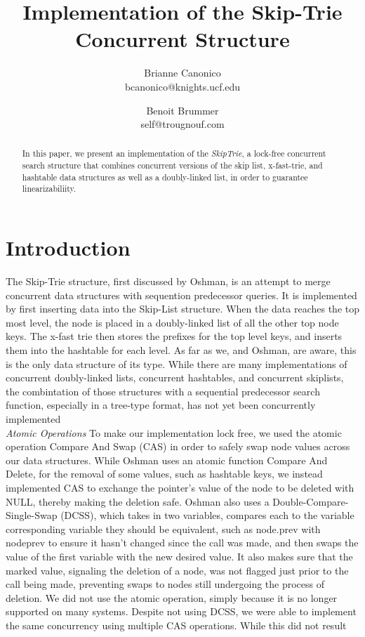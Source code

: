 \documentclass[10pt,twocolumn]{article}
\begin{document}
\title{Implementation of the Skip-Trie Concurrent Structure}
\author{Brianne Canonico\\bcanonico@knights.ucf.edu
\and Benoit Brummer\\self@trougnouf.com}
\date{}
\maketitle

\begin{abstract}
In this paper, we present an implementation of the \emph{SkipTrie}, a lock-free concurrent search structure that combines concurrent versions of the skip list, x-fast-trie, and hashtable data structures as well as a doubly-linked list, in order to guarantee linearizabiliity.
\end{abstract}

\section{Introduction}

The Skip-Trie structure, first discussed by Oshman, is an attempt to merge concurrent data structures with sequention predecessor queries.  It is implemented by first inserting data into the Skip-List structure.  When the data reaches the top most level, the node is placed in a doubly-linked list of all the other top node keys.  The x-fast trie then stores the prefixes for the top level keys, and inserts them into the hashtable for each level.  As far as we, and Oshman, are aware, this is the only data structure of its type.  While there are many implementations of concurrent doubly-linked lists, concurrent hashtables, and concurrent skiplists, the combintation of those structures with a sequential predecessor search function, especially in a tree-type format, has not yet been concurrently implemented\\

\emph{Atomic Operations}
To make our implementation lock free, we used the atomic operation Compare And Swap (CAS) in order to safely swap node values across our data structures.  While Oshman uses an atomic function Compare And Delete, for the removal of some values, such as hashtable keys, we instead implemented CAS to exchange the pointer's value of the node to be deleted with NULL, thereby making the deletion safe.  Oshman also uses a Double-Compare-Single-Swap (DCSS), which takes in two variables, compares each to the variable corresponding variable they should be equivalent, such as node.prev with nodeprev to ensure it hasn't changed since the call was made, and then swaps the value of the first variable with the new desired value.  It also makes sure that the marked value, signaling the deletion of a node, was not flagged just prior to the call being made, preventing swaps to nodes still undergoing the process of deletion.  We did not use the atomic operation, simply because it is no longer supported on many systems.  Despite not using DCSS, we were able to implement the same concurrency using multiple CAS operations.  While this did not result\\
\end{document}
